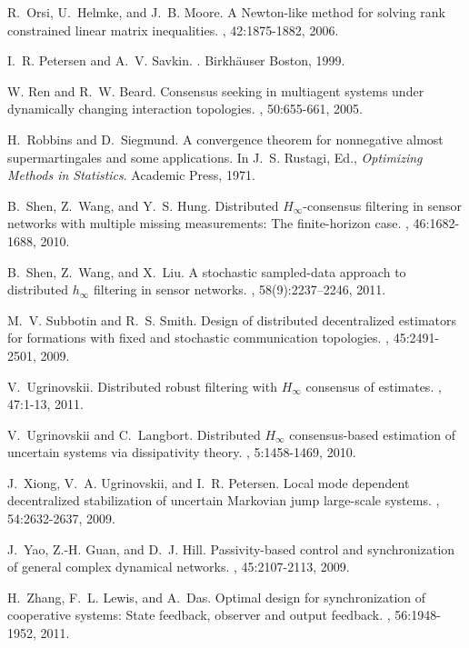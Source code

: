 \documentclass[a4paper,twocolumn]{autart}
\begin{document}
\begin{thebibliography}{10}
R.~Orsi, U.~Helmke, and J.~B. Moore.
\newblock A {N}ewton-like method for solving rank constrained linear matrix
  inequalities.
, 42:1875-1882, 2006.

I.~R. Petersen and A.~V. Savkin.
.
\newblock Birkh\"{a}user Boston, 1999.

W. Ren and R.~W. Beard.
\newblock Consensus seeking in multiagent systems under dynamically changing
  interaction topologies.
, 50:655-661, 2005.

H.~Robbins and D.~Siegmund.
\newblock A convergence theorem for nonnegative almost supermartingales and
  some applications.
\newblock In J.~S. Rustagi, Ed., {\em Optimizing Methods in Statistics}.
  Academic Press, 1971.

B.~Shen, Z.~Wang, and Y.~S. Hung.
\newblock Distributed ${H}_\infty$-consensus filtering in sensor networks with
  multiple missing measurements: {T}he finite-horizon case.
, 46:1682-1688, 2010.

B.~Shen, Z.~Wang, and X.~Liu.
\newblock A stochastic sampled-data approach to distributed $h_\infty$
  filtering in sensor networks.
,
  58(9):2237--2246, 2011.

M.~V. Subbotin and R.~S. Smith.
\newblock Design of distributed decentralized estimators for formations with
  fixed and stochastic communication topologies.
, 45:2491-2501, 2009.

V.~Ugrinovskii.
\newblock Distributed robust filtering with ${H}_\infty$ consensus of
  estimates.
, 47:1-13, 2011.

V.~Ugrinovskii and C.~Langbort.
\newblock Distributed ${H}_\infty$ consensus-based estimation of uncertain
  systems via dissipativity theory.
, 5:1458-1469, 2010.

J.~Xiong, V.~A. Ugrinovskii, and I.~R. Petersen.
\newblock Local mode dependent decentralized stabilization of uncertain
  {M}arkovian jump large-scale systems.
, 54:2632-2637,
  2009.

J.~Yao, Z.-H. Guan, and D.~J. Hill.
\newblock Passivity-based control and synchronization of general complex
  dynamical networks.
, 45:2107-2113, 2009.

H.~Zhang, F.~L. Lewis, and A.~Das.
\newblock Optimal design for synchronization of cooperative systems: {S}tate
  feedback, observer and output feedback.
, 56:1948-1952, 2011.

\end{thebibliography}
\end{document}
